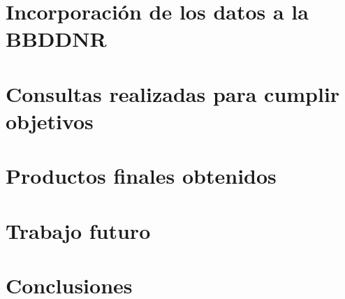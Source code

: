 \documentclass[spanish]{article}
\begin{document}
\section{Incorporación de los datos a la BBDDNR}

\section{Consultas realizadas para cumplir objetivos}

\section{Productos finales obtenidos}

\section{Trabajo futuro}

\section{Conclusiones}
\end{document}
